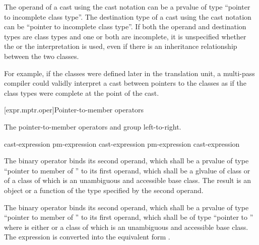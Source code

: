 \pnum
{}%
The operand of a cast using the cast notation can be a prvalue of type
``pointer to incomplete class type''. The destination type of a cast
using the cast notation can be ``pointer to incomplete class type''. If
both the operand and destination types are class types and one or both
are incomplete, it is unspecified whether the  or the
 interpretation is used, even if there is an
inheritance relationship between the two classes.
\begin{note}
For example, if the classes were defined later in the translation unit,
a multi-pass compiler could validly interpret a cast between
pointers to the classes as if the class types were complete at the point
of the cast.
\end{note}

[expr.mptr.oper]{Pointer-to-member operators}

\pnum
{}%
%
%
%
%
%
The pointer-to-member operators \tcode{->*} and  group
left-to-right.

\begin{bnf}
\br
    cast-expression\br
    pm-expression  cast-expression\br
    pm-expression \terminal{->*} cast-expression
\end{bnf}

\pnum
The binary operator  binds its second operand, which shall be
a prvalue
of type ``pointer to member of '' to its first operand, which shall be
a glvalue
of
class  or of a class of which  is an unambiguous and
accessible base class. The result is an object or a function of the type
specified by the second operand.

\pnum
The binary operator \tcode{->*} binds its second operand, which shall be
a prvalue
of type ``pointer to member of '' to its first operand, which shall be of
type ``pointer to ''
where  is either  or
a class of which 
is an unambiguous and accessible base class.
The expression  is converted into the equivalent form
.

